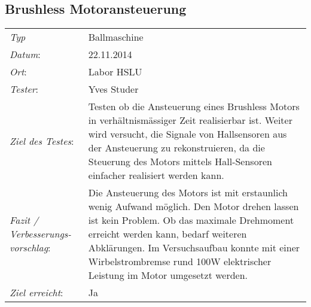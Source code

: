 \subsection{Brushless Motoransteuerung}

\begin{tabular}{p{3.6cm}p{9.4cm}}
\textit{Typ}              & Ballmaschine\\ 
\textit{Datum}:           & 22.11.2014\\
\textit{Ort}:             & Labor HSLU\\
\textit{Tester}:          & Yves Studer\\
\textit{Ziel des Testes}: & Testen ob die Ansteuerung eines Brushless Motors in verhältnismässiger Zeit realisierbar ist. Weiter wird versucht, die Signale von Hallsensoren aus der Ansteuerung zu rekonstruieren, da die Steuerung des Motors mittels Hall-Sensoren einfacher realisiert werden kann.\\
\textit{Fazit / Verbesserungs-\newline vorschlag}: & Die Ansteuerung des Motors ist mit erstaunlich wenig Aufwand möglich. Den Motor drehen lassen ist kein Problem. Ob das maximale Drehmoment erreicht werden kann, bedarf weiteren Abklärungen. Im Versuchsaufbau konnte mit einer Wirbelstrombremse rund 100W elektrischer Leistung im Motor umgesetzt werden. \\ 
\textit{Ziel erreicht}:& Ja\\
\end{tabular}
 